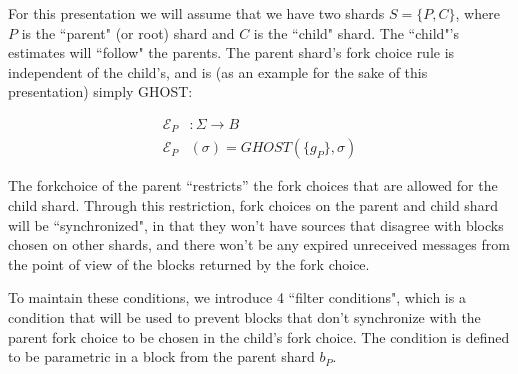 For this presentation we will assume that we have two shards $S= \{P, C\}$, where $P$ is the ``parent" (or root) shard and $C$ is the ``child" shard. The ``child"'s estimates will ``follow" the parents. The parent shard's fork choice rule is independent of the child's, and is (as an example for the sake of this presentation) simply GHOST:

\begin{defn}
\begin{align*}
  \mathcal{E}_P&: \Sigma \to B \\
  \mathcal{E}_P&(\sigma) = GHOST(\{g_P\}, \sigma)
\end{align*}
\end{defn}

The forkchoice of the parent ``restricts'' the fork choices that are allowed for the child shard. Through this restriction, fork choices on the parent and child shard will be ``synchronized", in that they won't have sources that disagree with blocks chosen on other shards, and there won't be any expired unreceived messages from the point of view of the blocks returned by the fork choice.

To maintain these conditions, we introduce 4 ``filter conditions", which is a condition that will be used to prevent blocks that don't synchronize with the parent fork choice to be chosen in the child's fork choice. The condition is defined to be parametric in a block from the parent shard $b_P$.

